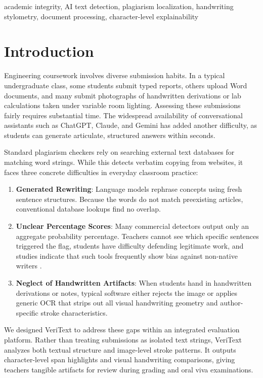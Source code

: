\documentclass[conference]{IEEEtran}
\begin{document}
\begin{IEEEkeywords}
academic integrity, AI text detection, plagiarism localization, handwriting stylometry, document processing, character-level explainability
\end{IEEEkeywords}

\section{Introduction}
Engineering coursework involves diverse submission habits. In a typical undergraduate class, some students submit typed reports, others upload Word documents, and many submit photographs of handwritten derivations or lab calculations taken under variable room lighting. Assessing these submissions fairly requires substantial time. The widespread availability of conversational assistants such as ChatGPT, Claude, and Gemini has added another difficulty, as students can generate articulate, structured answers within seconds.

Standard plagiarism checkers rely on searching external text databases for matching word strings. While this detects verbatim copying from websites, it faces three concrete difficulties in everyday classroom practice:
\begin{enumerate}
    \item \textbf{Generated Rewriting}: Language models rephrase concepts using fresh sentence structures. Because the words do not match preexisting articles, conventional database lookups find no overlap.
    \item \textbf{Unclear Percentage Scores}: Many commercial detectors output only an aggregate probability percentage. Teachers cannot see which specific sentences triggered the flag, students have difficulty defending legitimate work, and studies indicate that such tools frequently show bias against non-native writers \cite{liang2023gpt}.
    \item \textbf{Neglect of Handwritten Artifacts}: When students hand in handwritten derivations or notes, typical software either rejects the image or applies generic OCR that strips out all visual handwriting geometry and author-specific stroke characteristics.
\end{enumerate}

We designed VeriText to address these gaps within an integrated evaluation platform. Rather than treating submissions as isolated text strings, VeriText analyzes both textual structure and image-level stroke patterns. It outputs character-level span highlights and visual handwriting comparisons, giving teachers tangible artifacts for review during grading and oral viva examinations.
\end{document}
